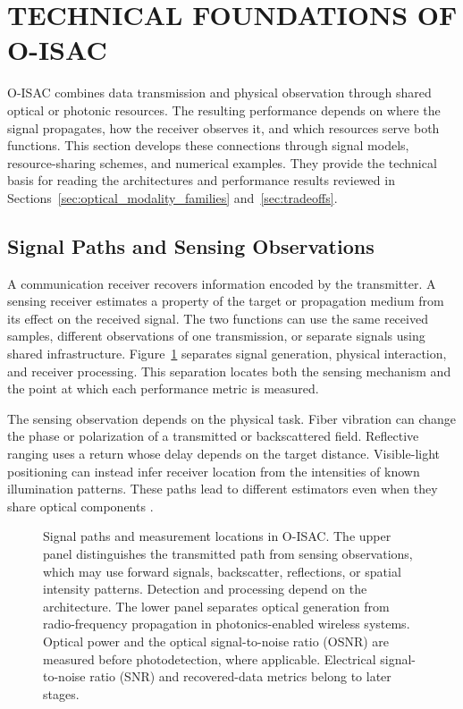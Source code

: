 \section{TECHNICAL FOUNDATIONS OF O-ISAC}
\label{sec:foundations_comparison}

O-ISAC combines data transmission and physical observation through shared
optical or photonic resources. The resulting performance depends on where
the signal propagates, how the receiver observes it, and which resources serve
both functions. This
section develops these connections through signal models, resource-sharing
schemes, and numerical examples. They provide the technical basis for reading
the architectures and performance results reviewed in
Sections~\ref{sec:optical_modality_families} and~\ref{sec:tradeoffs}.

\subsection{Signal Paths and Sensing Observations}
\label{sec:signal_paths_observations}

A communication receiver recovers information encoded by the transmitter.
A sensing receiver estimates a property of the target or propagation medium
from its effect on the received signal. The two functions can use the same
received samples, different observations of one transmission, or separate
signals using shared infrastructure.
Figure~\ref{fig:joint_evidence_anatomy} separates signal generation,
physical interaction, and receiver processing. This separation locates both
the sensing mechanism and the point at which each performance metric is
measured.

The sensing observation depends on the physical task. Fiber vibration can
change the phase or polarization of a transmitted or backscattered field.
Reflective ranging uses a return whose delay depends on the target distance.
Visible-light positioning can instead infer receiver location from the
intensities of known illumination patterns. These paths lead to different
estimators even when they share optical components
\cite{OISAC_SCR00220,OISAC_SCR00057,OISAC_SCR00912,OISAC_SCR00196}.

\begin{figure}[!t]
\centering

\caption{Signal paths and measurement locations in O-ISAC. The upper panel
distinguishes the transmitted path from sensing observations, which may use
forward signals, backscatter, reflections, or spatial intensity patterns.
Detection and processing depend on the architecture. The lower panel separates
optical generation from radio-frequency propagation in photonics-enabled
wireless systems. Optical power and the optical signal-to-noise ratio (OSNR)
are measured before photodetection, where applicable. Electrical
signal-to-noise ratio (SNR) and recovered-data metrics belong to later stages.}
\label{fig:joint_evidence_anatomy}
\end{figure}

